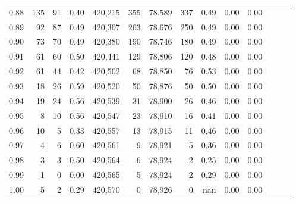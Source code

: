 \begin{tabular}{rrrrrrrrrrrrrr}
0.88 &     135 &     91 &  0.40 &  420,215 &      355 &  78,589 &     337 &  0.49 &  0.00 &      0.00 \\
0.89 &      92 &     87 &  0.49 &  420,307 &      263 &  78,676 &     250 &  0.49 &  0.00 &      0.00 \\
0.90 &      73 &     70 &  0.49 &  420,380 &      190 &  78,746 &     180 &  0.49 &  0.00 &      0.00 \\
0.91 &      61 &     60 &  0.50 &  420,441 &      129 &  78,806 &     120 &  0.48 &  0.00 &      0.00 \\
0.92 &      61 &     44 &  0.42 &  420,502 &       68 &  78,850 &      76 &  0.53 &  0.00 &      0.00 \\
0.93 &      18 &     26 &  0.59 &  420,520 &       50 &  78,876 &      50 &  0.50 &  0.00 &      0.00 \\
0.94 &      19 &     24 &  0.56 &  420,539 &       31 &  78,900 &      26 &  0.46 &  0.00 &      0.00 \\
0.95 &       8 &     10 &  0.56 &  420,547 &       23 &  78,910 &      16 &  0.41 &  0.00 &      0.00 \\
0.96 &      10 &      5 &  0.33 &  420,557 &       13 &  78,915 &      11 &  0.46 &  0.00 &      0.00 \\
0.97 &       4 &      6 &  0.60 &  420,561 &        9 &  78,921 &       5 &  0.36 &  0.00 &      0.00 \\
0.98 &       3 &      3 &  0.50 &  420,564 &        6 &  78,924 &       2 &  0.25 &  0.00 &      0.00 \\
0.99 &       1 &      0 &  0.00 &  420,565 &        5 &  78,924 &       2 &  0.29 &  0.00 &      0.00 \\
1.00 &       5 &      2 &  0.29 &  420,570 &        0 &  78,926 &       0 &   nan &  0.00 &      0.00 \\
\bottomrule
\end{tabular}
